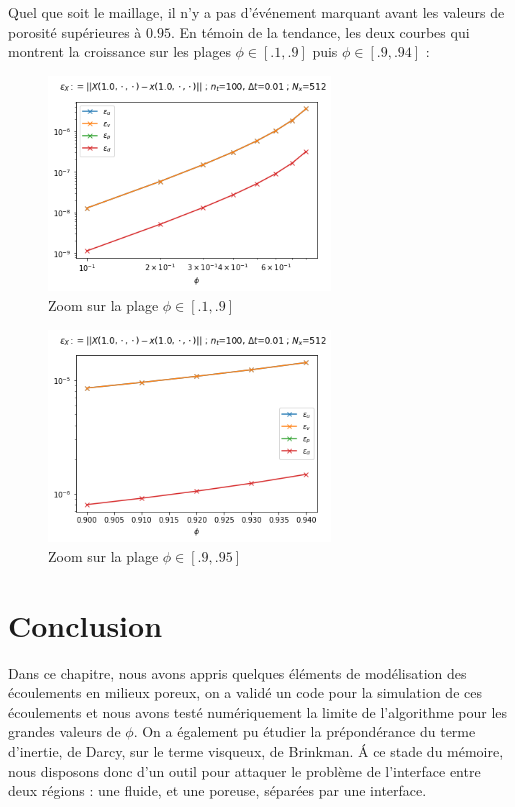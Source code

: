\newpage 

Quel que soit le maillage, il n'y a pas d'événement marquant avant les valeurs de porosité supérieures à $0.95$. En témoin de la tendance, les deux courbes qui montrent la croissance sur les plages $\phi \in [.1, .9]$ puis $\phi \in [.9, .94]$ :
\begin{figure}[htp]
    \centering
    \includegraphics[width=7.5cm]{Images/brinkman/porosite/Figure 2021-11-20 180634 (21).png}
    \caption{Zoom sur la plage $\phi \in [.1, .9]$}
\end{figure}

\begin{figure}[htp]
    \centering
    \includegraphics[width=7.5cm]{Images/brinkman/porosite/Figure 2021-11-20 180634 (22).png}
    \caption{Zoom sur la plage $\phi \in [.9, .95]$}
\end{figure}

\newpage

\section{Conclusion}

Dans ce chapitre, nous avons appris quelques éléments de modélisation des écoulements en milieux poreux, on a validé un code pour la simulation de ces écoulements et nous avons testé numériquement la limite de l'algorithme pour les grandes valeurs de $\phi$. On a également pu étudier la prépondérance du terme d'inertie, de Darcy, sur le terme visqueux, de Brinkman. \'A ce stade du mémoire, nous disposons donc d'un outil pour attaquer le problème de l'interface entre deux régions : une fluide, et une poreuse, séparées par une interface.